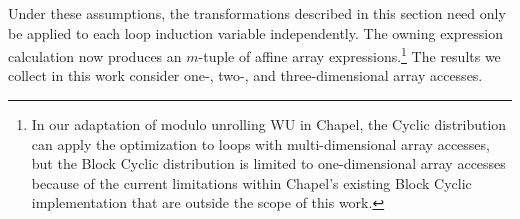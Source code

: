 Under these assumptions, the transformations described in this section need only be applied to each loop induction variable independently. The owning expression calculation now produces an $m$-tuple of affine array expressions.\footnote{In our adaptation of modulo unrolling WU in Chapel, the Cyclic distribution can apply the optimization to loops with multi-dimensional array accesses, but the Block Cyclic distribution is limited to one-dimensional array accesses because of the current limitations within Chapel's existing Block Cyclic implementation that are outside the scope of this work. } The results we collect in this work consider one-, two-, and three-dimensional array accesses. 




